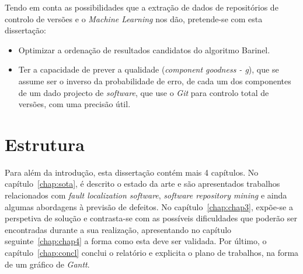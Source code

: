 Tendo em conta as possibilidades que a extração de dados de repositórios de controlo de versões e o \emph{Machine Learning} nos dão, pretende-se com esta dissertação:
%
\begin{itemize}
\item Optimizar a ordenação de resultados candidatos do algoritmo Barinel.
\item Ter a capacidade de prever a qualidade (\emph{component goodness - g}), que se assume ser o inverso da probabilidade de erro, de cada um dos componentes de um dado projecto de \emph{software}, que use o \emph{Git} para controlo total de versões, com uma precisão útil.
\end{itemize}

\section{Estrutura} \label{sec:struct}

Para além da introdução, esta dissertação contém mais 4 capítulos.
No capítulo~\ref{chap:sota}, é descrito o estado da arte e são apresentados trabalhos relacionados com \emph{fault localization software}, \emph{software repository mining} e ainda algumas abordagens à previsão de defeitos. No capítulo~\ref{chap:chap3}, expõe-se a perspetiva de solução e contrasta-se com as possíveis dificuldades que poderão ser encontradas durante a sua realização, apresentando no capítulo seguinte~\ref{chap:chap4} a forma como esta deve ser validada. Por último, o capítulo~\ref{chap:concl} conclui o relatório e explicita o plano de trabalhos, na forma de um gráfico de \emph{Gantt}.
